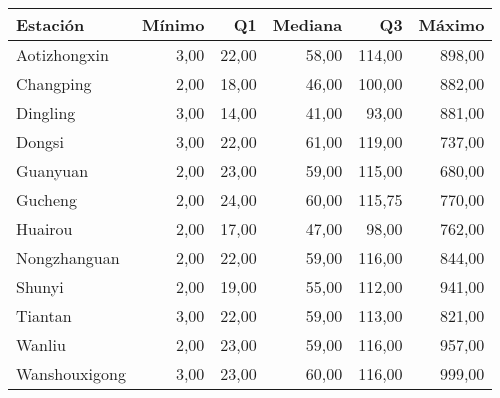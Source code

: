 \begin{table}[ht]
\centering
\begin{tabular}{lrrrrr}
  \hline
Estación & Mínimo & Q1 & Mediana & Q3 & Máximo \\ 
  \hline
Aotizhongxin & 3,00 & 22,00 & 58,00 & 114,00 & 898,00 \\ 
  Changping & 2,00 & 18,00 & 46,00 & 100,00 & 882,00 \\ 
  Dingling & 3,00 & 14,00 & 41,00 & 93,00 & 881,00 \\ 
  Dongsi & 3,00 & 22,00 & 61,00 & 119,00 & 737,00 \\ 
  Guanyuan & 2,00 & 23,00 & 59,00 & 115,00 & 680,00 \\ 
  Gucheng & 2,00 & 24,00 & 60,00 & 115,75 & 770,00 \\ 
  Huairou & 2,00 & 17,00 & 47,00 & 98,00 & 762,00 \\ 
  Nongzhanguan & 2,00 & 22,00 & 59,00 & 116,00 & 844,00 \\ 
  Shunyi & 2,00 & 19,00 & 55,00 & 112,00 & 941,00 \\ 
  Tiantan & 3,00 & 22,00 & 59,00 & 113,00 & 821,00 \\ 
  Wanliu & 2,00 & 23,00 & 59,00 & 116,00 & 957,00 \\ 
  Wanshouxigong & 3,00 & 23,00 & 60,00 & 116,00 & 999,00 \\ 
   \hline
\end{tabular}
\end{table}
